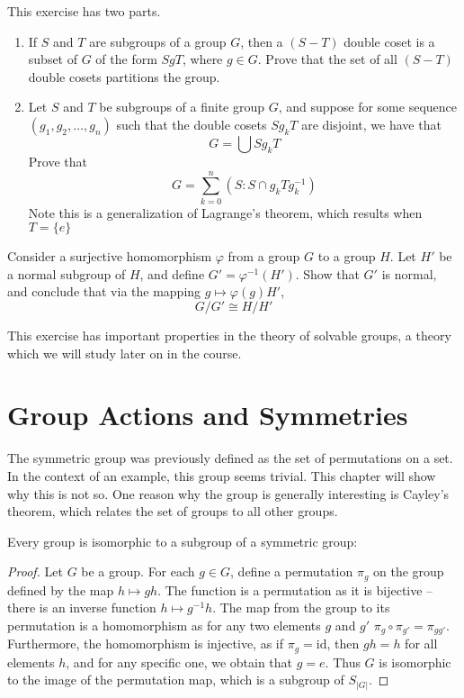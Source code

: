 \begin{exercise}
    This exercise has two parts.

    \begin{enumerate}
        \item If $S$ and $T$ are subgroups of a group $G$, then a $(S - T)$ double coset is a subset of $G$ of the form $SgT$, where $g \in G$. Prove that the set of all $(S - T)$ double cosets partitions the group.
        \item Let $S$ and $T$ be subgroups of a finite group $G$, and suppose for some sequence $(g_1, g_2, \dots, g_n)$ such that the double cosets $Sg_kT$ are disjoint, we have that
        \[ G = \bigcup Sg_kT \]
        Prove that
        \[ G = \sum_{k = 0}^n (S:S \cap g_kTg_k^{-1}) \]
        Note this is a generalization of Lagrange's theorem, which results when $T = \{ e \}$
    \end{enumerate}
\end{exercise}

\begin{exercise}
    Consider a surjective homomorphism $\varphi$ from a group $G$ to a group $H$. Let $H'$ be a normal subgroup of $H$, and define $G' = \varphi^{-1}(H')$. Show that $G'$ is normal, and conclude that via the mapping $g \mapsto \varphi(g)H'$,
    \[ G/G' \cong H/H' \]
\end{exercise}

This exercise has important properties in the theory of solvable groups, a theory which we will study later on in the course.





\chapter{Group Actions and Symmetries}

The symmetric group was previously defined as the set of permutations on a set. In the context of an example, this group seems trivial. This chapter will show why this is not so. One reason why the group is generally interesting is Cayley's theorem, which relates the set of groups to all other groups.

\begin{theorem} 
    Every group is isomorphic to a subgroup of a symmetric group:
\end{theorem}
\begin{proof}
    Let $G$ be a group. For each $g \in G$, define a permutation $\pi_g$ on the group defined by the map $h \mapsto gh$. The function is a permutation as it is bijective -- there is an inverse function $h \mapsto g^{-1}h$. The map from the group to its permutation is a homomorphism as for any two elements $g$ and $g'$ $\pi_g \circ \pi_{g'} = \pi_{gg'}$. Furthermore, the homomorphism is injective, as if $\pi_g = \text{id}$, then $gh = h$ for all elements $h$, and for any specific one, we obtain that $g = e$. Thus $G$ is isomorphic to the image of the permutation map, which is a subgroup of $S_{|G|}$.
\end{proof}

